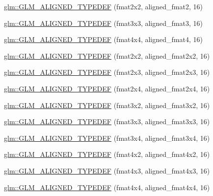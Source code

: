 \begin{DoxyCompactItemize}
\item 
\hyperlink{group__gtx__type__aligned_ga719da577361541a4c43a2dd1d0e361e1}{glm\-::\-G\-L\-M\-\_\-\-A\-L\-I\-G\-N\-E\-D\-\_\-\-T\-Y\-P\-E\-D\-E\-F} (fmat2x2, aligned\-\_\-fmat2, 16)
\item 
\hyperlink{group__gtx__type__aligned_ga6e7ee4f541e1d7db66cd1a224caacafb}{glm\-::\-G\-L\-M\-\_\-\-A\-L\-I\-G\-N\-E\-D\-\_\-\-T\-Y\-P\-E\-D\-E\-F} (fmat3x3, aligned\-\_\-fmat3, 16)
\item 
\hyperlink{group__gtx__type__aligned_gae5d672d359f2a39f63f98c7975057486}{glm\-::\-G\-L\-M\-\_\-\-A\-L\-I\-G\-N\-E\-D\-\_\-\-T\-Y\-P\-E\-D\-E\-F} (fmat4x4, aligned\-\_\-fmat4, 16)
\item 
\hyperlink{group__gtx__type__aligned_ga6fa2df037dbfc5fe8c8e0b4db8a34953}{glm\-::\-G\-L\-M\-\_\-\-A\-L\-I\-G\-N\-E\-D\-\_\-\-T\-Y\-P\-E\-D\-E\-F} (fmat2x2, aligned\-\_\-fmat2x2, 16)
\item 
\hyperlink{group__gtx__type__aligned_ga0743b4f4f69a3227b82ff58f6abbad62}{glm\-::\-G\-L\-M\-\_\-\-A\-L\-I\-G\-N\-E\-D\-\_\-\-T\-Y\-P\-E\-D\-E\-F} (fmat2x3, aligned\-\_\-fmat2x3, 16)
\item 
\hyperlink{group__gtx__type__aligned_ga1a76b325fdf70f961d835edd182c63dd}{glm\-::\-G\-L\-M\-\_\-\-A\-L\-I\-G\-N\-E\-D\-\_\-\-T\-Y\-P\-E\-D\-E\-F} (fmat2x4, aligned\-\_\-fmat2x4, 16)
\item 
\hyperlink{group__gtx__type__aligned_ga4b4e181cd041ba28c3163e7b8074aef0}{glm\-::\-G\-L\-M\-\_\-\-A\-L\-I\-G\-N\-E\-D\-\_\-\-T\-Y\-P\-E\-D\-E\-F} (fmat3x2, aligned\-\_\-fmat3x2, 16)
\item 
\hyperlink{group__gtx__type__aligned_ga27b13f465abc8a40705698145e222c3f}{glm\-::\-G\-L\-M\-\_\-\-A\-L\-I\-G\-N\-E\-D\-\_\-\-T\-Y\-P\-E\-D\-E\-F} (fmat3x3, aligned\-\_\-fmat3x3, 16)
\item 
\hyperlink{group__gtx__type__aligned_ga2608d19cc275830a6f8c0b6405625a4f}{glm\-::\-G\-L\-M\-\_\-\-A\-L\-I\-G\-N\-E\-D\-\_\-\-T\-Y\-P\-E\-D\-E\-F} (fmat3x4, aligned\-\_\-fmat3x4, 16)
\item 
\hyperlink{group__gtx__type__aligned_ga93f09768241358a287c4cca538f1f7e7}{glm\-::\-G\-L\-M\-\_\-\-A\-L\-I\-G\-N\-E\-D\-\_\-\-T\-Y\-P\-E\-D\-E\-F} (fmat4x2, aligned\-\_\-fmat4x2, 16)
\item 
\hyperlink{group__gtx__type__aligned_ga7c117e3ecca089e10247b1d41d88aff9}{glm\-::\-G\-L\-M\-\_\-\-A\-L\-I\-G\-N\-E\-D\-\_\-\-T\-Y\-P\-E\-D\-E\-F} (fmat4x3, aligned\-\_\-fmat4x3, 16)
\item 
\hyperlink{group__gtx__type__aligned_ga07c75cd04ba42dc37fa3e105f89455c5}{glm\-::\-G\-L\-M\-\_\-\-A\-L\-I\-G\-N\-E\-D\-\_\-\-T\-Y\-P\-E\-D\-E\-F} (fmat4x4, aligned\-\_\-fmat4x4, 16)

\end{DoxyCompactItemize}
